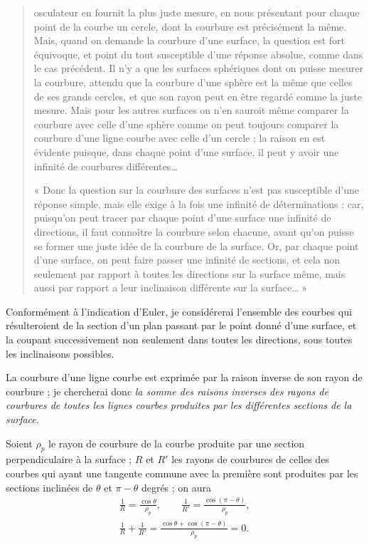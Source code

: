 \documentclass[11pt,a4paper]{article}
\begin{document}
\begin{quote}
osculateur en fournit la plus juste mesure, en nous présentant pour chaque
point de la courbe un cercle, dont la courbure est précisément la même. Mais,
quand on demande la courbure d'une surface, la question est fort équivoque, et
point du tout susceptible d'une réponse absolue, comme dans le cas précédent.
Il n'y a que les surfaces sphériques dont on puisse mesurer la courbure,
attendu que la courbure d'une sphère est la même que celles de ses grands
cercles, et que son rayon peut en être regardé comme la juste mesure. Mais
pour les autres surfaces on n'en sauroit même comparer la courbure avec celle
d'une sphère comme on peut toujours comparer la courbure d'une ligne courbe
avec celle d'un cercle ; la raison en est évidente puisque, dans chaque point
d'une surface, il peut y avoir une infinité de courbures différentes\ldots{}

« Donc la question sur la courbure des surfaces n'est pas susceptible d'une
réponse simple, mais elle exige à la fois une infinité de déterminations :
car, puisqu'on peut tracer par chaque point d'une surface une infinité de
directions, il faut connoître la courbure selon chacune, avant qu'on puisse se
former une juste idée de la courbure de la surface. Or, par chaque point d'une
surface, on peut faire passer une infinité de sections, et cela non seulement
par rapport à toutes les directions sur la surface même, mais aussi par
rapport a leur inclinaison différente sur la surface\ldots{} »
\end{quote}

Conformément à l'indication d'Euler, je considérerai l'ensemble des courbes
qui résulteroient de la section d'un plan passant par le point donné d'une
surface, et la coupant successivement non seulement dans toutes les
directions,  sous toutes
les inclinaisons possibles.

La courbure d'une ligne courbe est exprimée par la raison inverse de son rayon
de courbure ; je chercherai donc \emph{la somme des raisons inverses des
rayons de courbures de toutes les lignes courbes produites par les différentes
sections de la surface}.

Soient $\rho_p$ le rayon de courbure de la courbe produite par une section
perpendiculaire à la surface ; $R$ et $R'$ les rayons de courbures de celles
des courbes qui ayant une tangente commune avec la première sont produites par
les sections inclinées de $\theta$ et $\pi-\theta$ degrés ; on aura
\begin{gather*}
  \frac{1}{R} = \frac{\cos\theta}{\rho_p}, \qquad
  \frac{1}{R'} = \frac{\cos(\pi-\theta)}{\rho_p}, \\
  \frac{1}{R} + \frac{1}{R'} = \frac{\cos\theta + \cos(\pi-\theta)}{\rho_p} = 0 .
\end{gather*}
\end{document}
